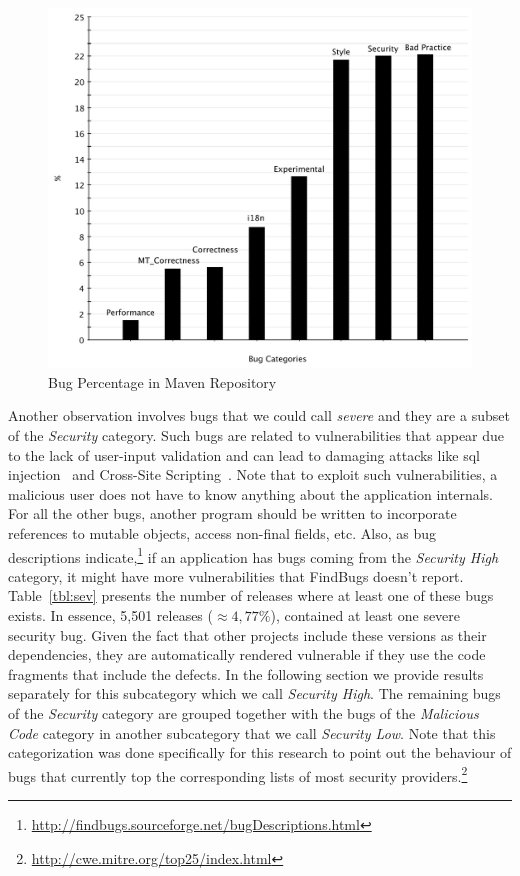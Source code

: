 \documentclass{sig-alternate}
\begin{document}
\begin{figure}[t]
	\centering
	\includegraphics[scale=0.39]{bug_percent}
	\caption{Bug Percentage in Maven Repository}
	\label{fig:bug-per} 
\end{figure}

Another observation involves bugs that we could call {\it
severe} and they are a subset of the {\it Security} category.
Such bugs are related to vulnerabilities that appear due to the lack of user-input
validation and can lead to damaging attacks like {\sc sql} injection~\cite{RL12} and
Cross-Site Scripting~\cite{WS08}.
Note that to exploit such vulnerabilities, a malicious user does
not have to know anything about the application internals. For all the other
bugs, another program should be written to incorporate references to
mutable objects, access non-final fields, etc.
Also, as bug descriptions indicate,\footnote{\url{http://findbugs.sourceforge.net/bugDescriptions.html}}
if an application has bugs coming from the {\it Security High} category,
it might have more vulnerabilities that FindBugs doesn't report.
Table~\ref{tbl:sev} presents the number
of releases where at least one of these bugs exists. In essence, 5,501 releases
($\approx 4,77\% $), contained at
least one severe security bug. Given the fact that other projects include these
versions as their dependencies, they are automatically rendered vulnerable if
they use the code fragments that include the defects.
In the following section
we provide results separately for this subcategory which we call {\it Security High}.
The remaining bugs of the {\it Security} category
are grouped together with the bugs of the {\it Malicious Code} category
in another subcategory that we call {\it Security Low}.
Note that this categorization was done specifically for this research to point out the
behaviour of bugs that currently top the corresponding lists of most
security providers.\footnote{\url{http://cwe.mitre.org/top25/index.html}}
\end{document}
